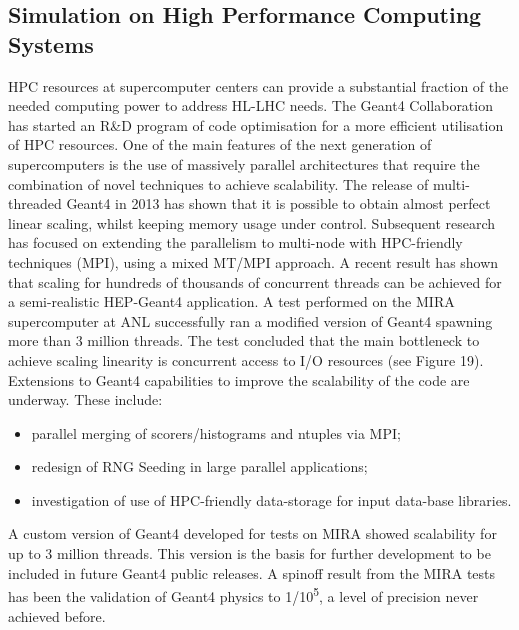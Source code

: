 \documentclass[12pt,a4paper]{article}
\begin{document}
{\hypertarget{simulation-on-high-performance-computing-systems}{%
\subsection{Simulation on High Performance Computing
Systems}\label{simulation-on-high-performance-computing-systems}}

HPC resources at supercomputer centers can provide a substantial
fraction of the needed computing power to address HL-LHC needs. The
Geant4 Collaboration has started an R\&D program of code optimisation
for a more efficient utilisation of HPC resources. One of the main
features of the next generation of supercomputers is the use of
massively parallel architectures that require the combination of novel
techniques to achieve scalability. The release of multi-threaded Geant4
in 2013 has shown that it is possible to obtain almost perfect linear
scaling, whilst keeping memory usage under control. Subsequent research
has focused on extending the parallelism to multi-node with HPC-friendly
techniques (MPI), using a mixed MT/MPI approach. A recent result has
shown that scaling for hundreds of thousands of concurrent threads can
be achieved for a semi-realistic HEP-Geant4 application. A test
performed on the MIRA supercomputer at ANL successfully ran a modified
version of Geant4 spawning more than 3 million threads. The
test concluded that the main bottleneck to achieve scaling linearity is
concurrent access to I/O resources (see Figure 19). Extensions to Geant4
capabilities to improve the scalability of the code are underway. These
include:

\begin{itemize}
\item
  parallel merging of scorers/histograms and ntuples via MPI;
\item
  redesign of RNG Seeding in large parallel applications;
\item
  investigation of use of HPC-friendly data-storage for input data-base
  libraries.
\end{itemize}

A custom version of Geant4 developed for tests on MIRA showed
scalability for up to 3 million threads. This version is the basis for
further development to be included in future Geant4 public releases. A
spinoff result from the MIRA tests has been the validation of Geant4
physics to 1/10\textsuperscript{5}, a level of precision never achieved
before.

}
\end{document}
